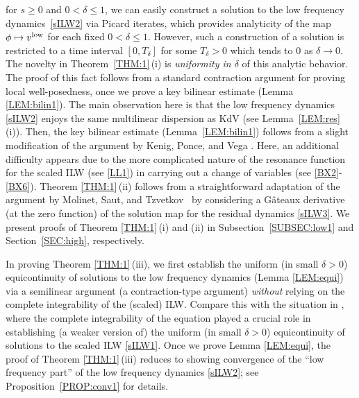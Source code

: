 \documentclass[letterpaper, 11pt,  reqno]{amsart}
\newcommand{\1}{\hspace{0.5mm}\textup{I}\hspace{0.5mm}}
\newcommand{\noi}{\noindent}
\newcommand{\low}{\textup{low}}
\newcommand{\dl}{\delta}
\numberwithin{equation}{section}
\numberwithin{theorem}{section}
\begin{document}
\noi
 for $s\ge 0$ and $0 < \dl \le 1$, 
we can easily construct a solution to 
 the low frequency dynamics~\eqref{sILW2} 
via Picard iterates, 
which provides analyticity 
of the map $\phi \mapsto v^\low$
 for each fixed \(0<\dl\leq 1\).
However, such a construction 
of a solution is restricted
to a time interval $[0, T_\dl]$
for some $T_\dl > 0$ which tends to $0$ as $\dl \to 0$.
 The novelty in Theorem~\ref{THM:1}\,(i) is 
{\it uniformity in $\dl$} of  this analytic behavior.
The proof of this fact
follows from 
a standard contraction argument
for proving local well-posedness, 
once we prove a key bilinear estimate
(Lemma \ref{LEM:bilin1}).
The main observation here is that 
 the low frequency dynamics
\eqref{sILW2}
enjoys the same multilinear dispersion as KdV
(see Lemma~\ref{LEM:res}\,(i)).
Then, 
the key  bilinear estimate
(Lemma~\ref{LEM:bilin1})
follows
from 
a slight modification of the argument by Kenig, Ponce, and Vega \cite{KPV96}. 
Here, an additional difficulty
appears due to the more complicated
nature of the resonance function for the scaled ILW
(see \eqref{LL1})
in carrying out a change of variables
(see \eqref{BX2}-\eqref{BX6}).
Theorem \ref{THM:1}\,(ii)
follows from a straightforward adaptation of 
the argument by 
Molinet, Saut, and Tzvetkov~\cite{MST}
by considering a G\^ateaux derivative 
(at the zero function)
of the solution map
for the residual dynamics \eqref{sILW3}.
We present proofs of Theorem \ref{THM:1}\,(i)
and (ii) in 
Subsection~\ref{SUBSEC:low1}
and Section~\ref{SEC:high}, respectively.




In proving Theorem \ref{THM:1}\,(iii), 
we first establish
 the uniform (in small $\dl> 0$)
equicontinuity  of solutions to 
the low frequency dynamics
(Lemma \ref{LEM:equi})
via a semilinear argument (a contraction-type argument)
{\it without} relying on the complete integrability of
the (scaled) ILW.
Compare this with the situation in \cite{CLOZ}, 
where the complete integrability of the equation 
played a crucial role
in establishing (a weaker version of)
the uniform (in small $\dl > 0$) equicontinuity
of solutions
to the scaled ILW \eqref{sILW1}.
Once we prove Lemma \ref{LEM:equi}, 
the proof of Theorem \ref{THM:1}\,(iii)
reduces to showing convergence
of the ``low frequency part''
of the low frequency dynamics \eqref{sILW2};
see 
 Proposition~\ref{PROP:conv1}
 for details.
\end{document}
